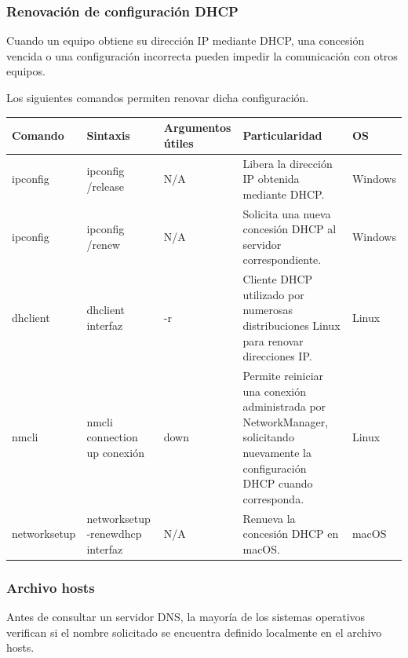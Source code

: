 \documentclass[a4paper,10pt]{article}
\begin{document}

\subsubsection{Renovación de configuración DHCP}

Cuando un equipo obtiene su dirección IP mediante DHCP, una concesión vencida
o una configuración incorrecta pueden impedir la comunicación con otros equipos.

Los siguientes comandos permiten renovar dicha configuración.

\begin{longtable}{|p{2.8cm}|p{3cm}|p{4cm}|p{5.6cm}|p{1.5cm}|}

\hline
Comando &
Sintaxis &
Argumentos útiles &
Particularidad &
OS
\\
\hline
\endhead

ipconfig &
ipconfig /release &
N/A &
Libera la dirección IP obtenida mediante DHCP. &
Windows
\\
\hline

ipconfig &
ipconfig /renew &
N/A &
Solicita una nueva concesión DHCP al servidor correspondiente. &
Windows
\\
\hline

dhclient &
dhclient interfaz &
-r &
Cliente DHCP utilizado por numerosas distribuciones Linux para renovar direcciones IP. &
Linux
\\
\hline

nmcli &
nmcli connection up conexión &
down &
Permite reiniciar una conexión administrada por NetworkManager, solicitando nuevamente la configuración DHCP cuando corresponda. &
Linux
\\
\hline

networksetup &
networksetup -renewdhcp interfaz &
N/A &
Renueva la concesión DHCP en macOS. &
macOS
\\
\hline

\end{longtable}


\subsubsection{Archivo hosts}

Antes de consultar un servidor DNS, la mayoría de los sistemas operativos
verifican si el nombre solicitado se encuentra definido localmente en el
archivo hosts.
\end{document}
